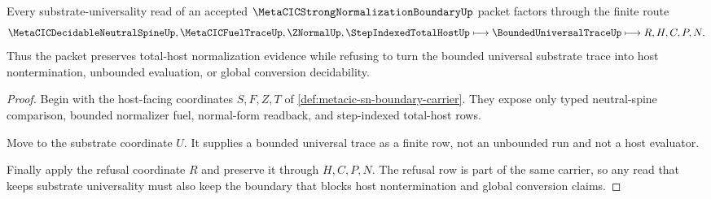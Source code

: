 \begin{theorem}
\label{thm:metacic-sn-boundary-turing-refusal-route}
Every substrate-universality read of an accepted $\MetaCICStrongNormalizationBoundaryUp$ packet factors through the finite route
$$
\MetaCICDecidableNeutralSpineUp,\MetaCICFuelTraceUp,\ZNormalUp,\StepIndexedTotalHostUp \longmapsto \BoundedUniversalTraceUp \longmapsto R,H,C,P,N .
$$
Thus the packet preserves total-host normalization evidence while refusing to turn the bounded universal substrate trace into host nontermination, unbounded evaluation, or global conversion decidability.
\end{theorem}
\begin{proof}
Begin with the host-facing coordinates $S,F,Z,T$ of \autoref{def:metacic-sn-boundary-carrier}. They expose only typed neutral-spine comparison, bounded normalizer fuel, normal-form readback, and step-indexed total-host rows.

Move to the substrate coordinate $U$. It supplies a bounded universal trace as a finite row, not an unbounded run and not a host evaluator.

Finally apply the refusal coordinate $R$ and preserve it through $H,C,P,N$. The refusal row is part of the same carrier, so any read that keeps substrate universality must also keep the boundary that blocks host nontermination and global conversion claims.
\end{proof}




